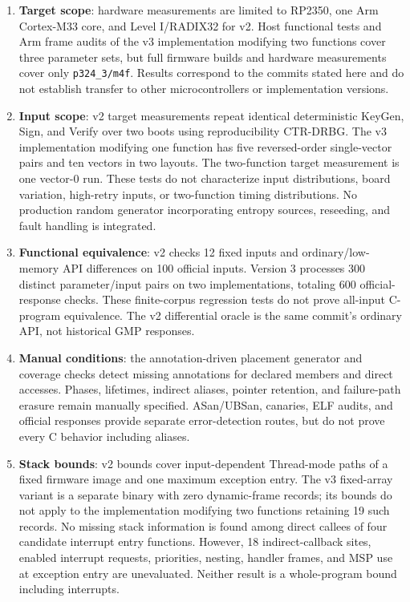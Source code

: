 \documentclass[a4paper,10pt]{article}
\theoremstyle{definition}
\theoremstyle{remark}
\begin{document}
\begin{enumerate}[leftmargin=2.2em]
  \item \textbf{Target scope}: hardware measurements are limited to RP2350, one Arm Cortex-M33 core, and Level I/RADIX32 for v2. Host functional tests and Arm frame audits of the v3 implementation modifying two functions cover three parameter sets, but full firmware builds and hardware measurements cover only \texttt{p324\_3/m4f}. Results correspond to the commits stated here and do not establish transfer to other microcontrollers or implementation versions.
  \item \textbf{Input scope}: v2 target measurements repeat identical deterministic KeyGen, Sign, and Verify over two boots using reproducibility CTR-DRBG. The v3 implementation modifying one function has five reversed-order single-vector pairs and ten vectors in two layouts. The two-function target measurement is one vector-0 run. These tests do not characterize input distributions, board variation, high-retry inputs, or two-function timing distributions. No production random generator incorporating entropy sources, reseeding, and fault handling is integrated.
  \item \textbf{Functional equivalence}: v2 checks 12 fixed inputs and ordinary/low-memory API differences on 100 official inputs. Version 3 processes 300 distinct parameter/input pairs on two implementations, totaling 600 official-response checks. These finite-corpus regression tests do not prove all-input C-program equivalence. The v2 differential oracle is the same commit's ordinary API, not historical GMP responses.
  \item \textbf{Manual conditions}: the annotation-driven placement generator and coverage checks detect missing annotations for declared members and direct accesses. Phases, lifetimes, indirect aliases, pointer retention, and failure-path erasure remain manually specified. ASan/UBSan, canaries, ELF audits, and official responses provide separate error-detection routes, but do not prove every C behavior including aliases.
  \item \textbf{Stack bounds}: v2 bounds cover input-dependent Thread-mode paths of a fixed firmware image and one maximum exception entry. The v3 fixed-array variant is a separate binary with zero dynamic-frame records; its bounds do not apply to the implementation modifying two functions retaining 19 such records. No missing stack information is found among direct callees of four candidate interrupt entry functions. However, 18 indirect-callback sites, enabled interrupt requests, priorities, nesting, handler frames, and MSP use at exception entry are unevaluated. Neither result is a whole-program bound including interrupts.

\end{enumerate}
\end{document}
